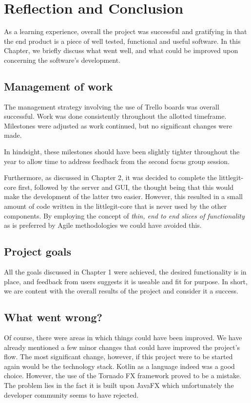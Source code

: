 
\chapter{Reflection and Conclusion}

As a learning experience, overall the project was successful and gratifying in that the end product is a piece of well tested, functional and useful software. In this Chapter, we briefly discuss what went well, and what could be improved upon concerning the software's development.

\section{Management of work}

The management strategy involving the use of Trello boards was overall successful. Work was done consistently throughout the allotted timeframe. Milestones were adjusted as work continued, but no significant changes were made. 

In hindsight, these milestones should have been slightly tighter throughout the year to allow time to address feedback from the second focus group session.

Furthermore, as discussed in Chapter 2, it was decided to complete the littlegit-core first, followed by the server and GUI, the thought being that this would make the development of the latter two easier. However, this resulted in a small amount of code written in the littlegit-core that is never used by the other components. By employing the concept of \emph{thin, end to end slices of functionality} as is preferred by Agile methodologies we could have avoided this.


\section{Project goals}

All the goals discussed in Chapter 1 were achieved, the desired functionality is in place, and feedback from users suggests it is useable and fit for purpose.  In short, we are content with the overall results of the project and consider it a success.


\section{What went wrong?}

Of course, there were areas in which things could have been improved. We have already mentioned a few minor changes that could have improved the project's flow. The most significant change, however, if this project were to be started again would be the technology stack. Kotlin as a language indeed was a good choice. However, the use of the Tornado FX framework proved to be a mistake. The problem lies in the fact it is built upon JavaFX which unfortunately the developer community seems to have rejected.

